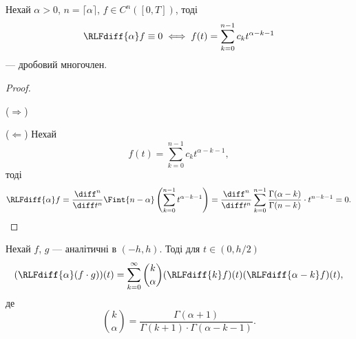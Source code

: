 \begin{theorem}
    Нехай $\alpha > 0$, $n = \lceil \alpha \rceil$, $f \in C^n([0, T])$, тоді
    \begin{equation}
        \RLFdiff{\alpha} f \equiv 0 \iff f(t) = \sum_{k = 0}^{n - 1} c_k t^{\alpha - k - 1}
    \end{equation}
    --- дробовий многочлен.
\end{theorem}
\begin{proof}
    \nothing
    \begin{exercise}
        ($\Longrightarrow$)
    \end{exercise}
    
    ($\Longleftarrow$) Нехай
    \begin{equation}
        f(t) = \sum_{k = 0}^{n - 1} c_k t^{\alpha - k - 1},
    \end{equation}
    тоді 
    \begin{equation}
        \RLFdiff{\alpha} f = \frac{\diff^n}{\diff t^n} \Fint{n - \alpha} \left( \sum_{k = 0}^{n - 1} t^{\alpha - k - 1} \right) = \frac{\diff^n}{\diff t^n} \sum_{k = 0}^{n - 1} \frac{\Gamma(\alpha - k)}{\Gamma(n - k)} \cdot t^{n - k - 1} = 0.
    \end{equation}
\end{proof}

\begin{theorem}
    Нехай $f$, $g$ --- аналітичні в $(-h, h)$. Тоді для $t \in (0, h/2)$
    \begin{equation}
        ( \RLFdiff{\alpha} (f \cdot g) ) (t) = \sum_{k = 0}^\infty \binom{k}{\alpha} ( \RLFdiff{k} f ) (t) ( \RLFdiff{\alpha - k} f ) (t),
    \end{equation}
    де
    \begin{equation}
        \binom{k}{\alpha} = \frac{\Gamma(\alpha + 1)}{\Gamma(k + 1) \cdot \Gamma(\alpha - k - 1)}.
    \end{equation}
\end{theorem}

